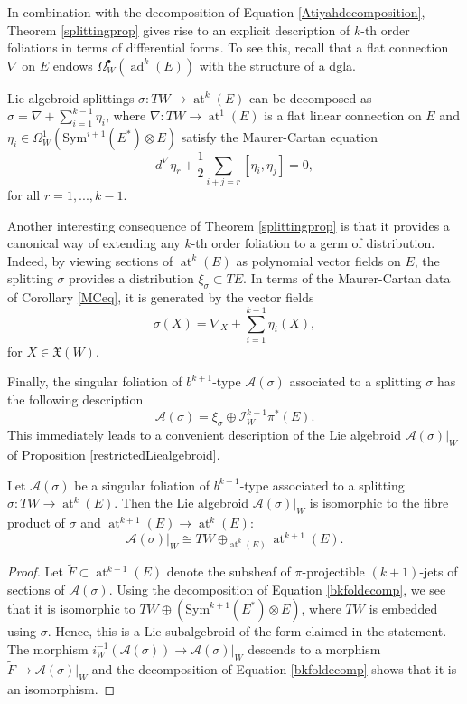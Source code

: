 \documentclass[10pt]{amsart}
\DeclareMathOperator{\at}{at}
\DeclareMathOperator{\ad}{ad}
\numberwithin{theoremalpha}{section}
\numberwithin{equation}{section}
\numberwithin{definition}{section}
\numberwithin{theorem}{section}
\numberwithin{proposition}{section}
\numberwithin{lemma}{section}
\numberwithin{example}{section}
\numberwithin{remark}{section}
\numberwithin{corollary}{section}
\numberwithin{question}{section}
\numberwithin{problem}{section}
\numberwithin{assumption}{section}
\theoremstyle{named}
\numberwithin{equation}{section}
\begin{document}
In combination with the decomposition of Equation \ref{Atiyahdecomposition}, Theorem \ref{splittingprop} gives rise to an explicit description of $k$-th order foliations in terms of differential forms. To see this, recall that a flat connection $\nabla$ on $E$ endows $\Omega_{W}^{\bullet}(\ad^{k}(E))$ with the structure of a dgla. 

\begin{corollary} \label{MCeq}
Lie algebroid splittings $\sigma : TW \to \at^{k}(E)$ can be decomposed as $\sigma = \nabla + \sum_{i = 1}^{k-1}\eta_{i}$, where $\nabla : TW \to \at^1(E)$ is a flat linear connection on $E$ and $\eta_{i} \in \Omega_{W}^{1}(\mathrm{Sym}^{i+1}(E^*) \otimes E)$ satisfy the Maurer-Cartan equation 
\[
d^{\nabla} \eta_{r} + \frac{1}{2} \sum_{i + j = r} [\eta_{i}, \eta_{j}] = 0,
\]
for all $ r = 1, ..., k-1$.
\end{corollary}

Another interesting consequence of Theorem \ref{splittingprop} is that it provides a canonical way of extending any $k$-th order foliation to a germ of distribution. Indeed, by viewing sections of $\at^{k}(E)$ as polynomial vector fields on $E$, the splitting $\sigma$ provides a distribution $\xi_{\sigma} \subset TE$. In terms of the Maurer-Cartan data of Corollary \ref{MCeq}, it is generated by the vector fields 
\[
\sigma(X) = \nabla_{X} + \sum_{i = 1}^{k-1}\eta_{i}(X),
\]
for $X \in \mathfrak{X}(W)$. 

Finally, the singular foliation of $b^{k+1}$-type $\mathcal{A}(\sigma)$ associated to a splitting $\sigma$ has the following description 
\begin{equation} \label{bkfoldecomp}
\mathcal{A}(\sigma) = \xi_{\sigma} \oplus \mathcal{I}_W^{k+1} \pi^*(E). 
\end{equation}
This immediately leads to a convenient description of the Lie algebroid $\mathcal{A}(\sigma)|_{W}$ of Proposition \ref{restrictedLiealgebroid}. 
\begin{corollary} \label{restrictedextendedatiyah}
Let $\mathcal{A}(\sigma)$ be a singular foliation of $b^{k+1}$-type associated to a splitting $\sigma: TW \to \at^{k}(E)$. Then the Lie algebroid $\mathcal{A}(\sigma)|_{W}$ is isomorphic to the fibre product of $\sigma$ and $\at^{k+1}(E) \to \at^{k}(E)$: 
\[
\mathcal{A}(\sigma)|_{W} \cong TW \oplus_{\at^{k}(E)} \at^{k+1}(E). 
\]
\end{corollary}
\begin{proof}
Let $\tilde{F} \subset \at^{k+1}(E)$ denote the subsheaf of $\pi$-projectible $(k+1)$-jets of sections of $\mathcal{A}(\sigma)$. Using the decomposition of Equation \ref{bkfoldecomp}, we see that it is isomorphic to $TW \oplus (\mathrm{Sym}^{k+1}(E^*) \otimes E) $, where $TW$ is embedded using $\sigma$. Hence, this is a Lie subalgebroid of the form claimed in the statement. The morphism $i^{-1}_{W}(\mathcal{A}(\sigma)) \to \mathcal{A}(\sigma)|_{W}$ descends to a morphism $\tilde{F} \to  \mathcal{A}(\sigma)|_{W}$ and the decomposition of Equation \ref{bkfoldecomp} shows that it is an isomorphism. 
\end{proof}
\end{document}
